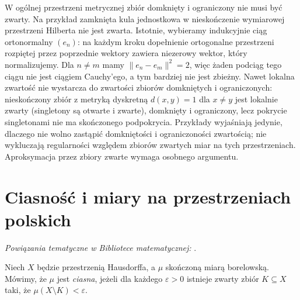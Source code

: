 \begin{uwaga}
W ogólnej przestrzeni metrycznej zbiór domknięty
i ograniczony nie musi być zwarty. Na przykład zamknięta
kula jednostkowa w nieskończenie wymiarowej przestrzeni
Hilberta nie jest zwarta. Istotnie, wybieramy indukcyjnie
ciąg ortonormalny $(e_n)$: na każdym kroku dopełnienie
ortogonalne przestrzeni rozpiętej przez poprzednie wektory
zawiera niezerowy wektor, który normalizujemy. Dla $n\ne m$
mamy $\|e_n-e_m\|^2=2$, więc żaden podciąg tego ciągu
nie jest ciągiem Cauchy'ego, a tym bardziej nie jest zbieżny.
Nawet lokalna zwartość nie wystarcza do zwartości
zbiorów domkniętych i ograniczonych: nieskończony zbiór
z metryką dyskretną $d(x,y)=1$ dla $x\ne y$
jest lokalnie zwarty (singletony są otwarte i zwarte),
domknięty i ograniczony, lecz pokrycie singletonami
nie ma skończonego podpokrycia.
Przykłady wyjaśniają jedynie, dlaczego nie wolno
zastąpić domkniętości i ograniczoności zwartością;
nie wykluczają regularności względem zbiorów zwartych
miar na tych przestrzeniach. Aproksymacja przez
zbiory zwarte wymaga osobnego argumentu.
\end{uwaga}

\section{Ciasność i miary na przestrzeniach polskich}

\noindent\emph{Powiązania tematyczne w Bibliotece matematycznej:} .

\begin{definicja}
\label{def:tight-single-20}
Niech $X$ będzie przestrzenią Hausdorffa, a $\mu$
skończoną miarą borelowską. Mówimy, że $\mu$ jest
\emph{ciasna}, jeżeli dla każdego $\varepsilon>0$
istnieje zwarty zbiór $K\subseteq X$ taki,
że $\mu(X\setminus K)<\varepsilon$.
\end{definicja}

